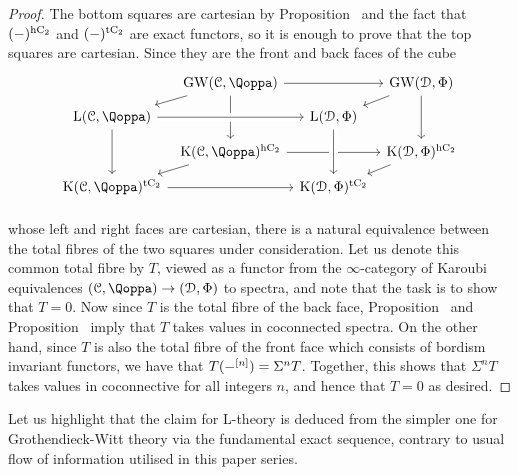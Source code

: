 \begin{proof}%
The bottom squares are cartesian by Proposition~ and the fact that $(-)^{\mathrm{h}\mathrm{C_2}}$ and $(-)^{\mathrm{t}\mathrm{C_2}}$ are exact functors, so it is enough to prove that the top squares are cartesian. Since they are the front and back faces of the cube
\[
\begin{tikzcd}
[column sep=0.5em, row sep=0.7em]
  & \GW(\C,\QF)\ar[rr]\ar[dd] \ar[ld]&& \GW(\D,\QFD)\ar[dd]\ar[ld]\\
\L(\C,\QF)\ar[rr, crossing over]\ar[dd] && \L(\D,\QFD)\\
  & \K(\C,\QF)^\hC\ar[rr]\ar[ld] && \K(\D,\QFD)^\hC\ar[ld]\\
\K(\C,\QF)^\tC\ar[rr] && \K(\D,\QFD)^\tC\ar[uu,<-, crossing over]\\
\end{tikzcd}
\]
whose left and right faces are cartesian, there is a natural equivalence between the total fibres of the two squares under consideration. Let us denote this common total fibre by $T$, viewed as a functor from the $\infty$-category of Karoubi equivalences $(\C,\QF) \to (\D,\QFD)$ to spectra,
and note that the task is to show that $T = 0$. Now since $T$ is the total fibre of the back face, Proposition~ and Proposition~ imply that $T$ takes values in coconnected spectra. On the other hand, since $T$ is also the total fibre of the front face which consists of bordism invariant functors, we have that $T(-^{[n]}) = \Sigma^nT$. Together, this shows that $\Sigma^nT$ takes values in coconnective for all integers $n$, and hence that $T=0$ as desired.
\end{proof}

Let us highlight that the claim for L-theory is deduced from the simpler one for Grothendieck-Witt theory via the fundamental exact sequence, contrary to usual flow of information utilised in this paper series.



